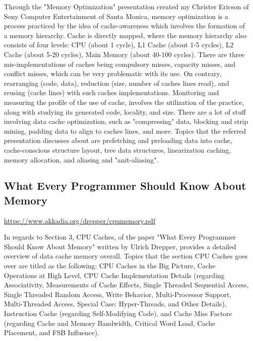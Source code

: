 \documentclass[letterpaper,10pt,onecolumn,compsoc]{IEEEtran}
\begin{document}
\noindent
Through the "Memory Optimization" presentation created my Christer Ericson of Sony Computer Entertainment of Santa Monica, memory optimization is a process practiced by the idea of cache-awareness which involves the formation of a memory hierarchy. Cache is directly mapped, where the memory hierarchy also consists of four levels: CPU (about 1 cycle), L1 Cache (about 1-5 cycles), L2 Cache (about 5-20 cycles), Main Memory (about 40-100 cycles). There are three mis-implementations of caches being compulsory misses, capacity misses, and conflict misses, which can be very problematic with its use. On contrary, rearranging (code, data), reduction (size, number of caches lines read), and reusing (cache lines) with such caches implementations. Monitoring and measuring the profile of the use of cache, involves the utilization of the practice, along with studying its generated code, locality, and size. There are a lot of stuff involving data cache optimization, such as "compressing" data, blocking and strip mining, padding data to align to caches lines, and more. Topics that the referred presentation discusses about are prefetching and preloading data into cache, cache-conscious structure layout, tree data structures, linearization caching, memory allocation, and aliasing and "anit-aliasing".

\subsection{What Every Programmer Should Know About Memory}


\noindent
\url{https://www.akkadia.org/drepper/cpumemory.pdf}

\noindent
In regards to Section 3, CPU Caches, of the paper "What Every Programmer Should Know About Memory" written by Ulrich Drepper, provides a detailed overview of data cache memory overall. Topics that the section CPU Caches goes over are titled as the following: CPU Caches in the Big Picture, Cache Operations at High Level, CPU Cache Implementation Details (regarding Associativity, Measurements of Cache Effects, Single Threaded Sequential Access, Single Threaded Random Access, Write Behavior, Multi-Processor Support, Multi-Threaded Access, Special Case: Hyper-Threads, and Other Details), Instruction Cache (regarding Self-Modifying Code), and Cache Miss Factors (regarding Cache and Memory Bandwidth, Critical Word Load, Cache Placement, and FSB Influence).

\newpage
\end{document}
